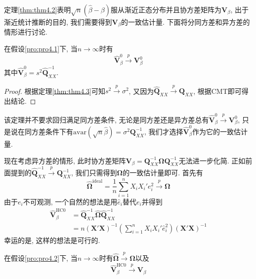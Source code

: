 \documentclass[cn, 12pt, math=mtpro2, bibstyle=apa, blue, twocol]{elegantbook}
\newcommand{\Q}{\mathbold{Q}}
\newcommand{\X}{\mathbold{X}}
\newcommand{\hb}{\hat{\beta}}
\newcommand{\V}{\mathbold{V}}
\newcommand{\Om}{\mathbold{\Omega}}
\begin{document}
定理\ref{thm:thm4.2}表明$\sqrt{n}(\hb-\beta)$服从渐近正态分布并且协方差矩阵为$\V_\beta$, 出于渐近统计推断的目的, 我们需要得到$\V_\beta$的一致估计量. 下面将分同方差和异方差的情形进行讨论.
\begin{theorem}
  在假设\ref{pro:pro4.1}下, 当$n\to\infty$时有
  $$\hat{\V}_\beta^0\xrightarrow{p}\V_\beta^0$$
  其中$\hat{\V}_\beta^0=s^2\hat{\Q}_{XX}^{-1}$.
\end{theorem}
\begin{proof}
  根据定理\ref{thm:thm4.3}可知$s^2\xrightarrow{p}\sigma^2$, 又因为$\hat{\Q}_{XX}\xrightarrow{p}\Q_{XX}$, 根据CMT即可得出结论.
\end{proof}
\begin{remark}
该定理并不要求回归满足同方差条件, 无论是同方差还是异方差总有$\hat{\V}_\beta^0\xrightarrow{p}\V_\beta^0$, 只是说在同方差条件下有$\text{avar}(\sqrt{n}\hb)=\sigma^2\Q_{XX}^{-1}$, 我们才选择$\hat{\V}_{\beta}^0$作为它的一致估计量.
\end{remark}
现在考虑异方差的情形, 此时协方差矩阵$\V_\beta=\Q_{XX}^{-1}\mathbold{\Omega}\Q_{XX}^{-1}$无法进一步化简. 正如前面提到的$\hat{\Q}_{XX}^{-1}\xrightarrow{p}\Q_{XX}^{-1}$, 我们只需得到$\mathbold{\Omega}$的一致估计量即可. 首先有
$$\hat{\Om}^\text{ideal}=\frac{1}{n}\sum_{i=1}^{n}X_iX_i'e_i^2\xrightarrow{p}\Om$$
由于$e_i$不可观测, 一个自然的想法是用$\hat{e}_i$替代$e_i$并得到
\begin{align}
\hat{\V}_\beta^{\text{HC0}}&=\hat{\Q}_{XX}^{-1}\hat{\mathbold{\Omega}}\hat{\Q}_{XX}^{-1} \label{eq4.12} \\
&=n(\X'\X)^{-1}\left(\sum_{i=1}^{n}X_iX_i'\hat{e}_i^2\right)(\X'\X)^{-1} \nonumber
\end{align}
幸运的是, 这样的想法是可行的.
\begin{theorem}\label{thm:thm4.4}
  在假设\ref{pro:pro4.2}下, 当$n\to\infty$时有$\hat{\mathbold{\Omega}}\xrightarrow{p}\mathbold{\Omega}$以及
  $$\hat{\V}_\beta^{\text{HC0}}\xrightarrow{p}\V_\beta$$
\end{theorem}
\end{document}
